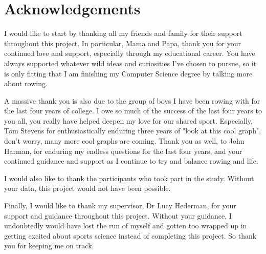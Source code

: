 \newpage
\onehalfspacing\raggedright %

\section*{\Huge{Acknowledgements}}
I would like to start by thanking all my friends and family for their support throughout this project. In particular, Mama and Papa, thank you for your continued love and support, especially through my educational career. You have always supported whatever wild ideas and curiosities I've chosen to pursue, so it is only fitting that I am finishing my Computer Science degree by talking more about rowing. 

A massive thank you is also due to the group of boys I have been rowing with for the last four years of college. I owe so much of the success of the last four years to you all, you really have helped deepen my love for our shared sport. Especially, Tom Stevens for enthusiastically enduring three years of "look at this cool graph", don't worry, many more cool graphs are coming. Thank you as well, to John Harman, for enduring my endless questions for the last four years, and your continued guidance and support as I continue to try and balance rowing and life.

I would also like to thank the participants who took part in the study. Without your data, this project would not have been possible. 

Finally, I would like to thank my supervisor, Dr Lucy Hederman, for your support and guidance throughout this project. Without your guidance, I undoubtedly would have lost the run of myself and gotten too wrapped up in getting excited about sports science instead of completing this project. So thank you for keeping me on track. 
